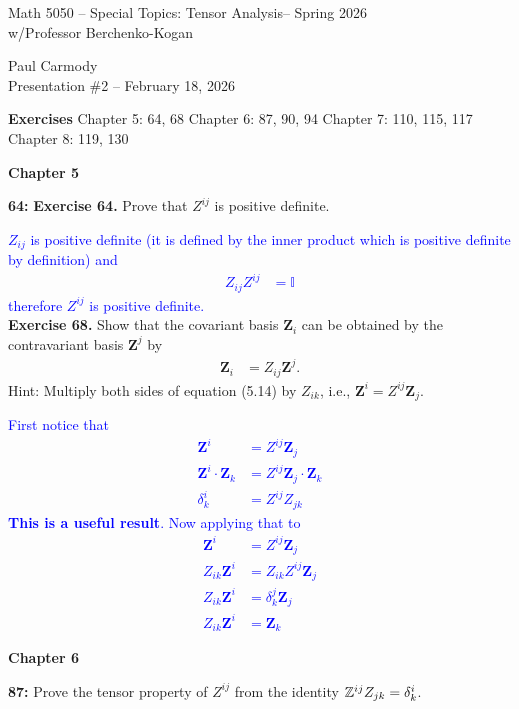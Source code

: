 \documentclass[12pt,a4paper]{report}
\newcommand{\CLASSNAME}{Math 5050 -- Special Topics: Tensor Analysis}
\newcommand{\STUDENTNAME}{Paul Carmody}
\newcommand{\ASSIGNMENT}{Presentation \#2 }
\newcommand{\DUEDATE}{February 18, 2026}
\newcommand{\PROFESSOR}{Professor Berchenko-Kogan}
\newcommand{\SEMESTER}{Spring 2026}
\newcommand{\BLUE}[1]{\textcolor{blue}{#1}}
\newcommand{\VK}[1]{\textbf{#1}}
\begin{document}
\begin{center}
	\Large{\CLASSNAME -- \SEMESTER} \\
	\large{ w/\PROFESSOR}
\end{center}
\begin{center}
	\STUDENTNAME \\
	\ASSIGNMENT -- \DUEDATE\\
\end{center} 

\textbf{\large{Exercises}}
Chapter 5: 64, 68
Chapter 6: 87, 90, 94
Chapter 7: 110, 115, 117
Chapter 8: 119, 130

\HLINE
\textbf{Chapter 5}

\textbf{64: }\textbf{Exercise 64.}  Prove that $Z^{ij}$ is positive definite.

\BLUE{$Z_{ij}$ is positive definite (it is defined by the inner product which is positive definite by definition) and
\begin{align*}
	Z_{ij}Z^{ij} &= \mathbb{I}
\end{align*}therefore $Z^{ij}$ is positive definite.
}\\

\textbf{Exercise 68.}  Show that the covariant basis $\VK{Z}_i$ can be obtained by the contravariant basis $\VK{Z}^j$ by 
\begin{align*}
	\VK{Z}_i &= Z_{ij}\VK{Z}^j.
\end{align*}Hint: Multiply both sides of equation (5.14) by $Z_{ik}$, i.e., $\VK{Z}^i = Z^{ij}\VK{Z}_j$.

\BLUE{First notice that
\begin{align*}
	\VK{Z}^i &= Z^{ij}\VK{Z}_j \\
	\VK{Z}^i\cdot\VK{Z}_k &= Z^{ij}\VK{Z}_j\cdot\VK{Z}_k \\
	\delta^i_k &= Z^{ij}Z_{jk}
\end{align*}\textbf{This is a useful result}.  Now applying that to
\begin{align*}
	\VK{Z}^i &= Z^{ij}\VK{Z}_j \\
	Z_{ik}\VK{Z}^i &= Z_{ik}Z^{ij}\VK{Z}_j \\
	Z_{ik}\VK{Z}^i &= \delta^j_k\VK{Z}_j \\
	Z_{ik}\VK{Z}^i &= \VK{Z}_k
\end{align*}
}

\HLINE
\textbf{Chapter 6}

\textbf{87: }Prove the tensor property of $Z^{ij}$ from the identity $\mathbb{Z}^{ij}Z_{jk}=\delta^i_k$.
\end{document}
